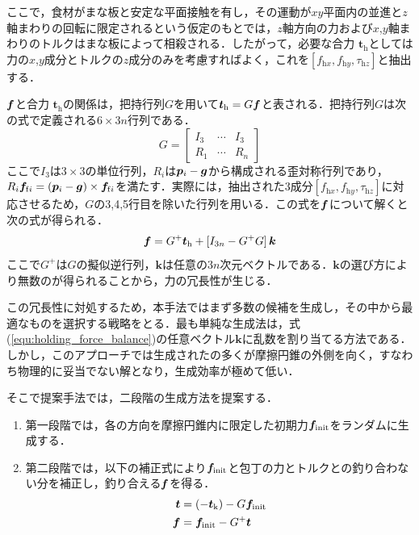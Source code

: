 ここで，食材がまな板と安定な平面接触を有し，その運動が$xy$平面内の並進と$z$軸まわりの回転に限定されるという仮定のもとでは，$z$軸方向の力および$x$,$y$軸まわりのトルクはまな板によって相殺される．したがって，必要な合力 $\bm{t}_{\mathrm{h}}$としては力の$x$,$y$成分とトルクの$z$成分のみを考慮すればよく，これを$[f_{\mathrm{h}x}, f_{\mathrm{h}y}, \tau_{\mathrm{h}z}]$と抽出する．

{\namegraspforce}$\bm{f}$と合力 $\bm{t}_{\mathrm{h}}$の関係は，把持行列$G$を用いて$\bm{t}_{\mathrm{h}} = G \bm{f}$と表される．把持行列$G$は次の式で定義される$6 \times 3n$行列である．
\begin{equation}
    G = \begin{bmatrix}I_3 & \cdots & I_3 \\ R_1 & \cdots & R_n \end{bmatrix}
    \label{equ:holding_grasp_matrix}
\end{equation}
ここで$I_{3}$は$3 \times 3$の単位行列，$R_{i}$は$\equfingerpoint[][i] - \bm{g}$から構成される歪対称行列であり，$R_i \equfingerforce[i] = (\equfingerpoint[][i] - \bm{g}) \times \equfingerforce[i]$を満たす．実際には，抽出された3成分$[f_{\mathrm{h}x}, f_{\mathrm{h}y}, \tau_{\mathrm{h}z}]$に対応させるため，$G$の3,4,5行目を除いた行列を用いる．この式を$\bm{f}$について解くと次の式が得られる．
\begin{equation}
    \bm{f} = G^+ \bm{t}_{\mathrm{h}} + [I_{3n}-G^+ G]\,\bm{k}
    \label{equ:holding_force_balance}
\end{equation}
ここで$G^+$は$G$の擬似逆行列，$\bm{k}$は任意の$3n$次元ベクトルである．$\bm{k}$の選び方により無数の{\namegraspforce}が得られることから，力の冗長性が生じる．

この冗長性に対処するため，本手法ではまず多数の{\namegraspforce}候補を生成し，その中から最適なものを選択する戦略をとる．最も単純な生成法は，式(\ref{equ:holding_force_balance})の任意ベクトル$\bm{k}$に乱数を割り当てる方法である．しかし，このアプローチでは生成された{\namefingerforce}の多くが摩擦円錐の外側を向く，すなわち物理的に妥当でない解となり，生成効率が極めて低い．

そこで提案手法では，二段階の生成方法を提案する．
\begin{enumerate}
    \item 第一段階では，各{\namefingerforce}の方向を摩擦円錐内に限定した初期力$\equgraspforcevector[init]$をランダムに生成する．
    \item 第二段階では，以下の補正式により$\equgraspforcevector[init]$と包丁の力とトルクとの釣り合わない分を補正し，釣り合える{\namegraspforce}$\bm{f}$を得る．
    \begin{align*}
        \bm{t} &= (-\bm{t}_{\mathrm{k}}) - G \equgraspforcevector[init] \\
        \equgraspforce &= \equgraspforcevector[init] - G^{+}\bm{t}
    \end{align*}
\end{enumerate}

